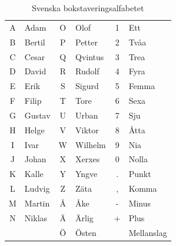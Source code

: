 \begin{table}[H]
	\centering
\begin{longtable}{cl|cl|cl }
	A & Adam   & O & Olof    & 1 & Ett        \\
	B & Bertil & P & Petter  & 2 & Tvåa       \\
	C & Cesar  & Q & Qvintus & 3 & Trea       \\
	D & David  & R & Rudolf  & 4 & Fyra       \\
	E & Erik   & S & Sigurd  & 5 & Femma      \\
	F & Filip  & T & Tore    & 6 & Sexa       \\
	G & Gustav & U & Urban   & 7 & Sju        \\
	H & Helge  & V & Viktor  & 8 & Åtta       \\
	I & Ivar   & W & Wilhelm & 9 & Nia        \\
	J & Johan  & X & Xerxes  & 0 & Nolla      \\
	K & Kalle  & Y & Yngve   & . & Punkt      \\
	L & Ludvig & Z & Zäta    & , & Komma      \\
	M & Martin & Å & Åke     & - & Minus      \\
	N & Niklas & Ä & Ärlig   & + & Plus       \\
	  &        & Ö & Östen   &   & Mellanslag \\
\end{longtable}
\caption{Svenska bokstaveringsalfabetet}
\end{table}

